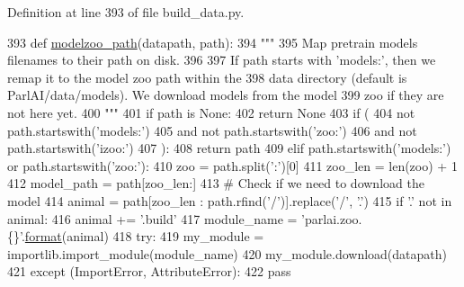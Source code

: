 Definition at line 393 of file build\+\_\+data.\+py.


\begin{DoxyCode}
393 \textcolor{keyword}{def }\hyperlink{namespaceparlai_1_1core_1_1build__data_ad06e9e38ca85db9c4a676ccd9ae41649}{modelzoo\_path}(datapath, path):
394     \textcolor{stringliteral}{"""}
395 \textcolor{stringliteral}{    Map pretrain models filenames to their path on disk.}
396 \textcolor{stringliteral}{}
397 \textcolor{stringliteral}{    If path starts with 'models:', then we remap it to the model zoo path within the}
398 \textcolor{stringliteral}{    data directory (default is ParlAI/data/models). We download models from the model}
399 \textcolor{stringliteral}{    zoo if they are not here yet.}
400 \textcolor{stringliteral}{    """}
401     \textcolor{keywordflow}{if} path \textcolor{keywordflow}{is} \textcolor{keywordtype}{None}:
402         \textcolor{keywordflow}{return} \textcolor{keywordtype}{None}
403     \textcolor{keywordflow}{if} (
404         \textcolor{keywordflow}{not} path.startswith(\textcolor{stringliteral}{'models:'})
405         \textcolor{keywordflow}{and} \textcolor{keywordflow}{not} path.startswith(\textcolor{stringliteral}{'zoo:'})
406         \textcolor{keywordflow}{and} \textcolor{keywordflow}{not} path.startswith(\textcolor{stringliteral}{'izoo:'})
407     ):
408         \textcolor{keywordflow}{return} path
409     \textcolor{keywordflow}{elif} path.startswith(\textcolor{stringliteral}{'models:'}) \textcolor{keywordflow}{or} path.startswith(\textcolor{stringliteral}{'zoo:'}):
410         zoo = path.split(\textcolor{stringliteral}{':'})[0]
411         zoo\_len = len(zoo) + 1
412         model\_path = path[zoo\_len:]
413         \textcolor{comment}{# Check if we need to download the model}
414         animal = path[zoo\_len : path.rfind(\textcolor{stringliteral}{'/'})].replace(\textcolor{stringliteral}{'/'}, \textcolor{stringliteral}{'.'})
415         \textcolor{keywordflow}{if} \textcolor{stringliteral}{'.'} \textcolor{keywordflow}{not} \textcolor{keywordflow}{in} animal:
416             animal += \textcolor{stringliteral}{'.build'}
417         module\_name = \textcolor{stringliteral}{'parlai.zoo.\{\}'}.\hyperlink{namespaceparlai_1_1chat__service_1_1services_1_1messenger_1_1shared__utils_a32e2e2022b824fbaf80c747160b52a76}{format}(animal)
418         \textcolor{keywordflow}{try}:
419             my\_module = importlib.import\_module(module\_name)
420             my\_module.download(datapath)
421         \textcolor{keywordflow}{except} (ImportError, AttributeError):
422             \textcolor{keywordflow}{pass}

\end{DoxyCode}
